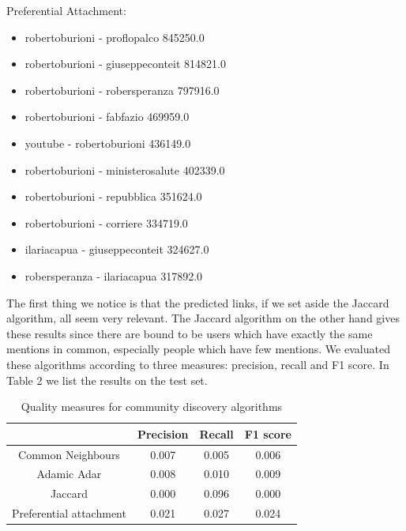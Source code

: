 \documentclass[sigchi]{acmart}
\begin{document}
Preferential Attachment:
\begin{itemize}
    \item robertoburioni - proflopalco 845250.0
\item robertoburioni - giuseppeconteit 814821.0
\item robertoburioni - robersperanza 797916.0
\item robertoburioni - fabfazio 469959.0
\item youtube - robertoburioni 436149.0
\item robertoburioni - ministerosalute 402339.0
\item robertoburioni - repubblica 351624.0
\item robertoburioni - corriere 334719.0
\item ilariacapua - giuseppeconteit 324627.0
\item robersperanza - ilariacapua 317892.0
\end{itemize}
The first thing we notice is that the predicted links, if we set aside the Jaccard algorithm, all seem very relevant. The Jaccard algorithm on the other hand gives these results since there are bound to be users which have exactly the same mentions in common, especially people which have few mentions. We evaluated these algorithms according to three measures: precision, recall and F1 score. In Table 2 we list the results on the test set.

\begin{table}
  \caption{Quality measures for community discovery algorithms}
  \label{tab:freq}
  \begin{tabular}{c|ccc}
    \toprule
     & Precision & Recall & F1 score\\
    \midrule
    Common Neighbours & 0.007 & 0.005 & 0.006\\
    Adamic Adar & 0.008 & 0.010 & 0.009 \\
    Jaccard & 0.000 & 0.096 & 0.000 \\
    Preferential attachment & 0.021 & 0.027& 0.024
  \bottomrule
\end{tabular}
\end{table}
\end{document}
